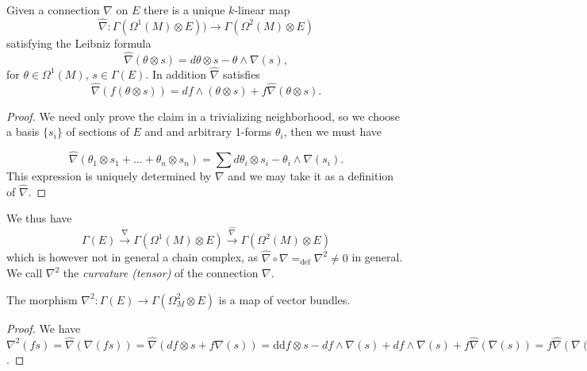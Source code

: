 \documentclass[a4paper,openany]{scrbook}
\begin{document}
\begin{lemma}
Given a connection $\nabla$ on $E$ there is a unique $k$-linear map 
\[
\hat{\nabla}: \Gamma (\Omega^1 (M)\otimes E)) \to \Gamma (\Omega^2(M)\otimes E)
\]
satisfying the Leibniz formula
\[
\hat{\nabla}(\theta \otimes s)= d \theta \otimes s - \theta \wedge \nabla (s),
\]
for $\theta \in \Omega^1(M)$, $s \in \Gamma(E)$. In addition $\hat{\nabla}$ satisfies 
\[
\hat{\nabla}(f(\theta \otimes s))= d f \wedge (\theta \otimes s) + f\hat{\nabla}(\theta \otimes s).
\]
\end{lemma}

\begin{proof}
We need only prove the claim in a trivializing neighborhood, so we choose a basis $\{s_i\}$ of sections of $E$ and and arbitrary 1-forms $\theta_i$, then we must have

\[
\hat{\nabla}(\theta_1 \otimes s_1 + \dots + \theta_n \otimes s_n)=\sum  d \theta_i \otimes s_i - \theta_i \wedge \nabla (s_i).
\]
This expression is uniquely determined by $\nabla$ and we may take it as a definition of $\hat{\nabla}$.
\end{proof}

We thus have 
\[
\Gamma(E) \xrightarrow{\nabla} \Gamma(\Omega^1(M)\otimes E) \xrightarrow{\hat{\nabla}} \Gamma (\Omega^2(M)\otimes E)
\] which is however not in general a chain complex, as $\hat{\nabla} \circ \nabla =_{\text{def}} \nabla^2 \neq 0$ in general. We call $\nabla^2$ the \emph{curvature (tensor)} of the connection $\nabla$.


%
%
%
\begin{lemma}
The morphism $\nabla^2\colon \Gamma(E) \to \Gamma(\Omega^2_M \otimes E)$ is a map of vector bundles.
\end{lemma}

\begin{proof} 
We have $\nabla^2 (fs)=\hat{\nabla}(\nabla(fs))=\hat{\nabla}( d f\otimes s + f\nabla(s))=\mathrm{dd}f \otimes s -  d  f \wedge \nabla(s) +  d f\wedge \nabla(s) + f \hat{\nabla}(\nabla (s))=f\hat{\nabla}(\nabla(s))=f\nabla^2 (s)$.
\end{proof}
\end{document}
